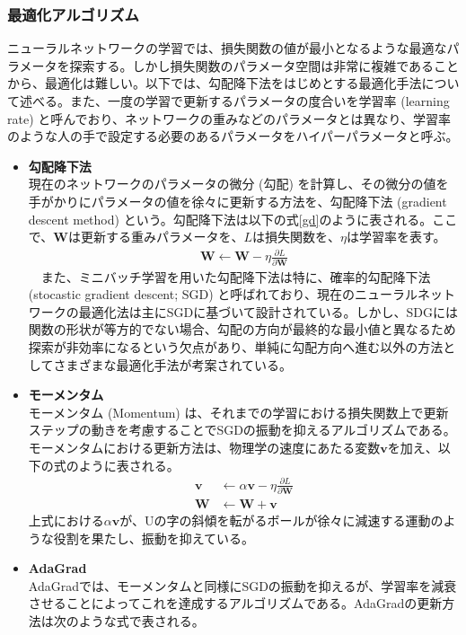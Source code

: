 \subsubsection{最適化アルゴリズム}
ニューラルネットワークの学習では、損失関数の値が最小となるような最適なパラメータを探索する。しかし損失関数のパラメータ空間は非常に複雑であることから、最適化は難しい。以下では、勾配降下法をはじめとする最適化手法について述べる。また、一度の学習で更新するパラメータの度合いを学習率 (learning rate) と呼んでおり、ネットワークの重みなどのパラメータとは異なり、学習率のような人の手で設定する必要のあるパラメータをハイパーパラメータと呼ぶ。
\begin{itemize}
\item \textbf{勾配降下法}\\
現在のネットワークのパラメータの微分 (勾配) を計算し、その微分の値を手がかりにパラメータの値を徐々に更新する方法を、勾配降下法 (gradient descent method) という。勾配降下法は以下の式\ref{gd}のように表される。ここで、$\bm{W}$は更新する重みパラメータを、$L$は損失関数を、$\eta$は学習率を表す。
\begin{align}
 \label{gd}
 \bm{W} \leftarrow \bm{W} - \eta \frac{\partial L}{\partial \bm{W}}
\end{align}
　また、ミニバッチ学習を用いた勾配降下法は特に、確率的勾配降下法 (stocastic gradient descent; SGD) と呼ばれており、現在のニューラルネットワークの最適化法は主にSGDに基づいて設計されている。しかし、SDGには関数の形状が等方的でない場合、勾配の方向が最終的な最小値と異なるため探索が非効率になるという欠点があり、単純に勾配方向へ進む以外の方法としてさまざまな最適化手法が考案されている。
\item \textbf{モーメンタム}\\
モーメンタム (Momentum) は、それまでの学習における損失関数上で更新ステップの動きを考慮することでSGDの振動を抑えるアルゴリズムである。モーメンタムにおける更新方法は、物理学の速度にあたる変数$\bm{v}$を加え、以下の式のように表される。
\begin{align}
\bm{v} &\leftarrow \alpha \bm{v} - \eta \frac{\partial L}{\partial \bm{W}}\\
\bm{W} &\leftarrow \bm{W} + \bm{v}
\end{align}
上式における$\alpha \bm{v}$が、Uの字の斜傾を転がるボールが徐々に減速する運動のような役割を果たし、振動を抑えている。
\item \textbf{AdaGrad}\\
AdaGradでは、モーメンタムと同様にSGDの振動を抑えるが、学習率を減衰させることによってこれを達成するアルゴリズムである。AdaGradの更新方法は次のような式で表される。

\end{itemize}
